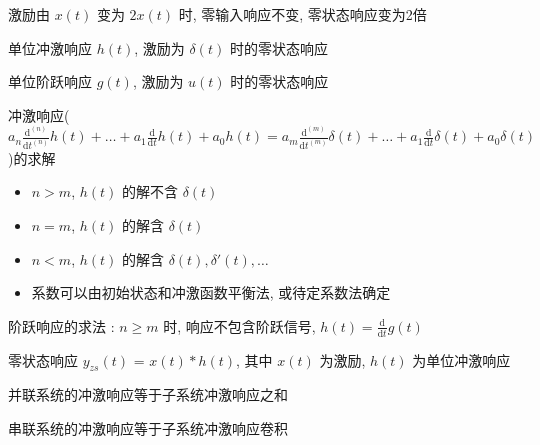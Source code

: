 \documentclass[UTF8, 12pt]{ctexart}
\begin{document}
	激励由 $ x(t) $ 变为 $ 2x(t) $ 时, 零输入响应不变, 零状态响应变为2倍

	单位冲激响应 $ h(t) $, 激励为 $ \delta(t) $ 时的零状态响应

	单位阶跃响应 $ g(t) $, 激励为 $ u(t) $ 时的零状态响应

	冲激响应($ a_{n}\frac{\mathrm{d}^{(n)}}{\mathrm{d}t^{(n)}}h(t) + \dots + a_{1}\frac{\mathrm{d}}{\mathrm{d}t}h(t) + a_{0}h(t) = 
			  a_{m}\frac{\mathrm{d}^{(m)}}{\mathrm{d}t^{(m)}}\delta(t) + \dots + a_{1}\frac{\mathrm{d}}{\mathrm{d}t}\delta(t) + a_{0}\delta(t) $)的求解
	\begin{itemize}[leftmargin = 4em]
		\item $ n > m $, $ h(t) $ 的解不含 $ \delta(t) $
		\item $ n = m $, $ h(t) $ 的解含 $ \delta(t) $
		\item $ n < m $, $ h(t) $ 的解含 $ \delta(t), \delta'(t), \dots $
		\item 系数可以由初始状态和冲激函数平衡法, 或待定系数法确定
	\end{itemize}

	阶跃响应的求法 : $ n \geq m $ 时, 响应不包含阶跃信号, $ h(t) = \frac{\mathrm{d}}{\mathrm{d}t}g(t) $

	零状态响应 $ y_{zs}(t) $ = $ x(t) * h(t) $, 其中 $ x(t) $ 为激励, $ h(t) $ 为单位冲激响应

	并联系统的冲激响应等于子系统冲激响应之和

	串联系统的冲激响应等于子系统冲激响应卷积
\end{document}
